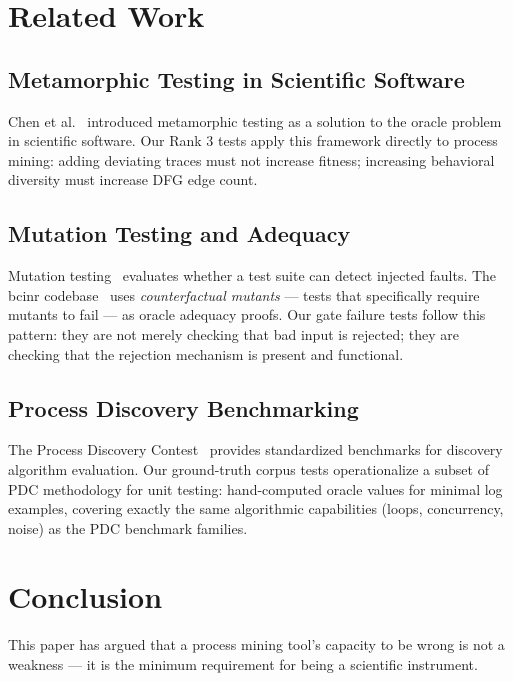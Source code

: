 \documentclass[12pt,a4paper]{article}
\begin{document}
\section{Related Work}
\label{sec:related}

\subsection{Metamorphic Testing in Scientific Software}

Chen et al.~\cite{chen2018} introduced metamorphic testing as a solution to the
oracle problem in scientific software. Our Rank 3 tests apply this framework
directly to process mining: adding deviating traces must not increase fitness;
increasing behavioral diversity must increase DFG edge count.

\subsection{Mutation Testing and Adequacy}

Mutation testing~\cite{jia2011} evaluates whether a test suite can detect
injected faults. The bcinr codebase~\cite{bcinr2025} uses \emph{counterfactual
mutants} --- tests that specifically require mutants to fail --- as oracle adequacy
proofs. Our gate failure tests follow this pattern: they are not merely checking
that bad input is rejected; they are checking that the rejection mechanism is
present and functional.

\subsection{Process Discovery Benchmarking}

The Process Discovery Contest~\cite{pdc2025} provides standardized benchmarks for
discovery algorithm evaluation. Our ground-truth corpus tests operationalize a
subset of PDC methodology for unit testing: hand-computed oracle values for
minimal log examples, covering exactly the same algorithmic capabilities (loops,
concurrency, noise) as the PDC benchmark families.

\section{Conclusion}
\label{sec:conclusion}

This paper has argued that a process mining tool's capacity to be wrong is not a
weakness --- it is the minimum requirement for being a scientific instrument.
\end{document}
